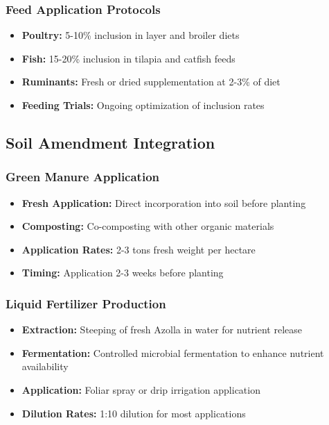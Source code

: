 \subsubsection{Feed Application Protocols}
\begin{itemize}
    \item \textbf{Poultry:} 5-10\% inclusion in layer and broiler diets
    \item \textbf{Fish:} 15-20\% inclusion in tilapia and catfish feeds
    \item \textbf{Ruminants:} Fresh or dried supplementation at 2-3\% of diet
    \item \textbf{Feeding Trials:} Ongoing optimization of inclusion rates
\end{itemize}

\subsection{Soil Amendment Integration}

\subsubsection{Green Manure Application}
\begin{itemize}
    \item \textbf{Fresh Application:} Direct incorporation into soil before planting
    \item \textbf{Composting:} Co-composting with other organic materials
    \item \textbf{Application Rates:} 2-3 tons fresh weight per hectare
    \item \textbf{Timing:} Application 2-3 weeks before planting
\end{itemize}

\subsubsection{Liquid Fertilizer Production}
\begin{itemize}
    \item \textbf{Extraction:} Steeping of fresh Azolla in water for nutrient release
    \item \textbf{Fermentation:} Controlled microbial fermentation to enhance nutrient availability
    \item \textbf{Application:} Foliar spray or drip irrigation application
    \item \textbf{Dilution Rates:} 1:10 dilution for most applications
\end{itemize}

